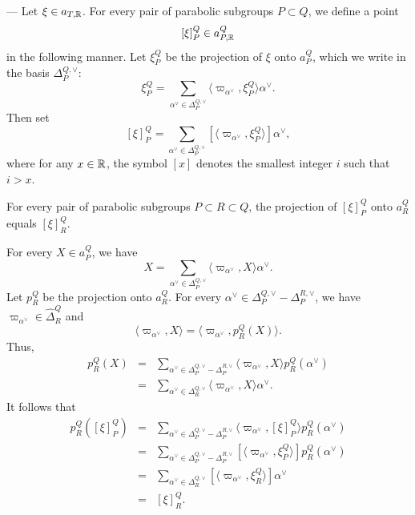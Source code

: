 \begin{paragr} ---
 Let $\xi \in  a_{T,\mathbb{R}}$. For every pair of parabolic subgroups $P\subset Q$, we define a point
$$[\xi]_P^Q\in a_{P,\mathbb{R}}^Q$$
in the following manner. Let $\xi_P^Q$ be the projection of $\xi$ onto $a_P^Q$, which we write in the basis $\Delta_P^{Q,\vee}$:
$$\xi_P^Q=\sum_{\alpha^\vee\in \Delta_P^{Q,\vee}} \langle\varpi_{\alpha^\vee}, \xi_P^Q  \rangle \alpha^\vee.$$
Then set
$$[\xi]_P^Q=\sum_{\alpha^\vee\in \Delta_P^{Q,\vee}} [\langle\varpi_{\alpha^\vee}, \xi_P^Q  \rangle] \alpha^\vee,$$
where for any $x\in \mathbb{R}$, the symbol $[x]$ denotes the smallest integer $i$ such that $i>x$. 

\begin{lemme}\label{lem:projxi}
For every pair of parabolic subgroups $P\subset R\subset Q$, the projection of $[\xi]_P^Q$ onto $a_R^Q$ equals $[\xi]_R^Q$.
\end{lemme}

\begin{preuve}
For every $X\in a_P^Q$, we have 
  $$X=\sum_{\alpha^\vee\in \Delta_P^{Q,\vee}} \langle \varpi_{\alpha^\vee}, X \rangle \alpha^\vee.$$
Let $p_R^Q$ be the projection onto $a_R^Q$.
For every $\alpha^\vee \in \Delta_P^{Q,\vee}-\Delta_P^{R,\vee}$, we have $\varpi_{\alpha^\vee}\in \hat{\Delta}_R^Q$ and 
$$ \langle \varpi_{\alpha^\vee}, X \rangle= \langle \varpi_{\alpha^\vee}, p_R^Q(X) \rangle.$$
Thus,
\begin{eqnarray*}
  p_R^Q(X) &=&\sum_{\alpha^\vee\in \Delta_P^{Q,\vee}-\Delta_P^{R,\vee}} \langle \varpi_{\alpha^\vee}, X \rangle p_R^Q(\alpha^\vee)\\
&=&\sum_{\alpha^\vee\in \Delta_R^{Q,\vee}} \langle \varpi_{\alpha^\vee}, X \rangle \alpha^\vee.
\end{eqnarray*}
It follows that
\begin{eqnarray*}
  p_R^Q([\xi]_P^Q) &=&\sum_{\alpha^\vee\in \Delta_P^{Q,\vee}-\Delta_P^{R,\vee}} \langle \varpi_{\alpha^\vee}, [\xi]_P^Q \rangle p_R^Q(\alpha^\vee)\\
&=& \sum_{\alpha^\vee\in \Delta_P^{Q,\vee}-\Delta_P^{R,\vee}} [\langle \varpi_{\alpha^\vee}, \xi_P^Q \rangle] p_R^Q(\alpha^\vee)\\
  &=& \sum_{\alpha^\vee\in \Delta_R^{Q,\vee}} [\langle \varpi_{\alpha^\vee}, \xi_R^Q \rangle] \alpha^\vee \\
&=& [\xi]_R^Q.
\end{eqnarray*}
\end{preuve}
\end{paragr}

